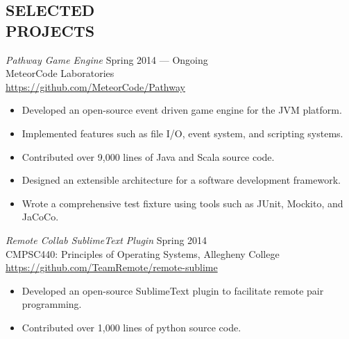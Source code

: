 \documentclass[margin]{res}
\begin{document}
\begin{resume}
\section{SELECTED \\ PROJECTS}
		{\sl Pathway Game Engine} \hfill Spring 2014 --- Ongoing \\
        		MeteorCode Laboratories \\ 
		\url{https://github.com/MeteorCode/Pathway}
		\begin{itemize} \itemsep -2pt %
		\item Developed an open-source event driven game engine for the JVM platform.
		\item Implemented features such as file I/O, event system, and scripting systems.
		\item Contributed over 9,000 lines of Java and Scala source code.
		\item Designed an extensible architecture for a software development framework.
		\item Wrote a comprehensive test fixture using tools such as JUnit, Mockito, and JaCoCo.
		\end{itemize}
		
		{\sl Remote Collab SublimeText Plugin } \hfill Spring 2014 \\
		CMPSC440: Principles of Operating Systems, Allegheny College \\
		\url{https://github.com/TeamRemote/remote-sublime}
		\begin{itemize}  \itemsep -2pt %
			\item Developed an open-source SublimeText plugin to facilitate remote pair programming.
			\item Contributed over 1,000 lines of python source code.
		\end{itemize}
		

\end{resume}
\end{document}
